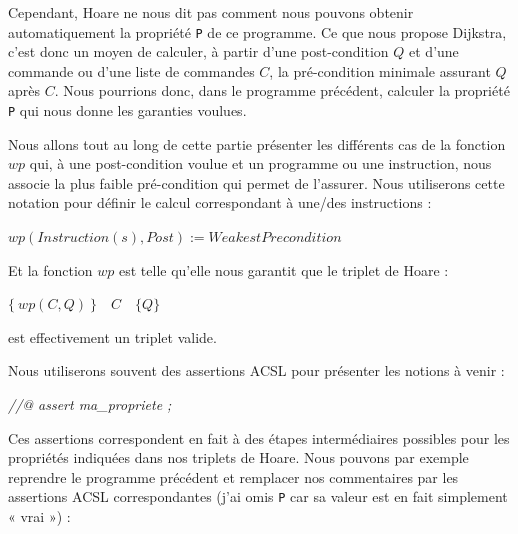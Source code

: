 \documentclass[12pt,francais,]{scrbook}
\newenvironment{Shaded}{}{}
\newcommand{\CommentTok}[1]{\textcolor[rgb]{0.38,0.63,0.69}{\textit{{#1}}}}
\begin{document}
Cependant, Hoare ne nous dit pas comment nous pouvons obtenir
automatiquement la propriété \texttt{P} de ce programme. Ce que nous
propose Dijkstra, c'est donc un moyen de calculer, à partir d'une
post-condition \(Q\) et d'une commande ou d'une liste de commandes
\(C\), la pré-condition minimale assurant \(Q\) après \(C\). Nous
pourrions donc, dans le programme précédent, calculer la propriété
\texttt{P} qui nous donne les garanties voulues.

Nous allons tout au long de cette partie présenter les différents cas de
la fonction \(wp\) qui, à une post-condition voulue et un programme ou
une instruction, nous associe la plus faible pré-condition qui permet de
l'assurer. Nous utiliserons cette notation pour définir le calcul
correspondant à une/des instructions :

\(wp(Instruction(s), Post) := WeakestPrecondition\)

\clearpage

Et la fonction \(wp\) est telle qu'elle nous garantit que le triplet de
Hoare :

\begin{center} \(\{\ wp(C,Q)\ \}\quad C\quad \{ Q \}\) \end{center}

est effectivement un triplet valide.

Nous utiliserons souvent des assertions ACSL pour présenter les notions
à venir :

\begin{footnotesize}\begin{Shaded}
\begin{Highlighting}[]
\CommentTok{//@ assert ma_propriete ;}
\end{Highlighting}
\end{Shaded}\end{footnotesize}

Ces assertions correspondent en fait à des étapes intermédiaires
possibles pour les propriétés indiquées dans nos triplets de Hoare. Nous
pouvons par exemple reprendre le programme précédent et remplacer nos
commentaires par les assertions ACSL correspondantes (j'ai omis
\texttt{P} car sa valeur est en fait simplement « vrai ») :
\end{document}
